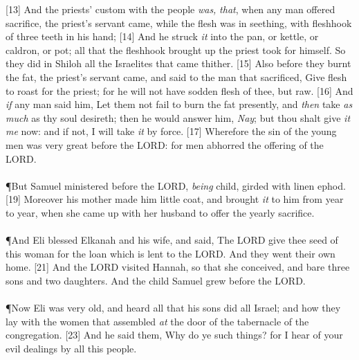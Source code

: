 [13] \textcolor[cmyk]{0.99998,1,0,0}{And the priests' custom with the people \emph{was,} \emph{that}, when any man offered sacrifice, the priest's servant came, while the flesh was in seething, with  fleshhook of three teeth in his hand;}
[14] \textcolor[cmyk]{0.99998,1,0,0}{And he struck \emph{it} into the pan, or kettle, or caldron, or pot; all that the fleshhook brought up the priest took for himself. So they did in Shiloh  all the Israelites that came thither.}
[15] \textcolor[cmyk]{0.99998,1,0,0}{Also before they burnt the fat, the priest's servant came, and said to the man that sacrificed, Give flesh to roast for the priest; for he will not have sodden flesh of thee, but raw.}
[16] \textcolor[cmyk]{0.99998,1,0,0}{And \emph{if} any man said  him, Let them not fail to burn the fat presently, and \emph{then} take \emph{as} \emph{much} as thy soul desireth; then he would answer him, \emph{Nay}; but thou shalt give \emph{it} \emph{me} now: and if not, I will take \emph{it} by force.}
[17] \textcolor[cmyk]{0.99998,1,0,0}{Wherefore the sin of the young men was very great before the LORD: for men abhorred the offering of the LORD.}\\
\\
\P \textcolor[cmyk]{0.99998,1,0,0}{But Samuel ministered before the LORD, \emph{being}  child, girded with  linen ephod.}
[19] \textcolor[cmyk]{0.99998,1,0,0}{Moreover his mother made him  little coat, and brought \emph{it} to him from year to year, when she came up with her husband to offer the yearly sacrifice.}\\
\\
\P \textcolor[cmyk]{0.99998,1,0,0}{And Eli blessed Elkanah and his wife, and said, The LORD give thee seed of this woman for the loan which is lent to the LORD. And they went  their own home.}
[21] \textcolor[cmyk]{0.99998,1,0,0}{And the LORD visited Hannah, so that she conceived, and bare three sons and two daughters. And the child Samuel grew before the LORD.}\\
\\
\P \textcolor[cmyk]{0.99998,1,0,0}{Now Eli was very old, and heard all that his sons did  all Israel; and how they lay with the women that assembled \emph{at} the door of the tabernacle of the congregation.}
[23] \textcolor[cmyk]{0.99998,1,0,0}{And he said  them, Why do ye such things? for I hear of your evil dealings by all this people.}
